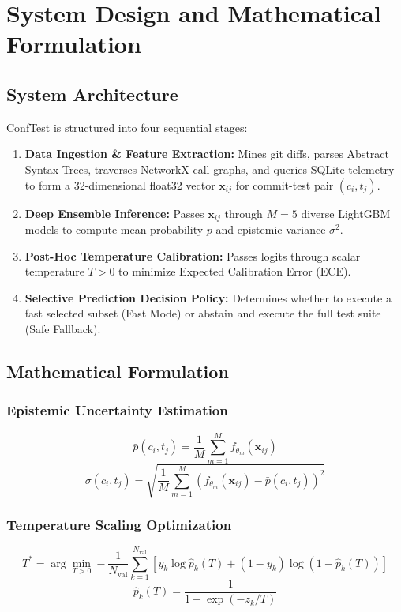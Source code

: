 \chapter{System Design and Mathematical Formulation}

\section{System Architecture}
ConfTest is structured into four sequential stages:
\begin{enumerate}
    \item \textbf{Data Ingestion \& Feature Extraction:} Mines git diffs, parses Abstract Syntax Trees, traverses NetworkX call-graphs, and queries SQLite telemetry to form a 32-dimensional float32 vector $\mathbf{x}_{ij}$ for commit-test pair $(c_i, t_j)$.
    \item \textbf{Deep Ensemble Inference:} Passes $\mathbf{x}_{ij}$ through $M=5$ diverse LightGBM models to compute mean probability $\bar{p}$ and epistemic variance $\sigma^2$.
    \item \textbf{Post-Hoc Temperature Calibration:} Passes logits through scalar temperature $T > 0$ to minimize Expected Calibration Error (ECE).
    \item \textbf{Selective Prediction Decision Policy:} Determines whether to execute a fast selected subset (Fast Mode) or abstain and execute the full test suite (Safe Fallback).
\end{enumerate}

\section{Mathematical Formulation}
\subsection{Epistemic Uncertainty Estimation}
\begin{equation}
    \bar{p}(c_i, t_j) = \frac{1}{M}\sum_{m=1}^M f_{\theta_m}(\mathbf{x}_{ij})
\end{equation}
\begin{equation}
    \sigma(c_i, t_j) = \sqrt{\frac{1}{M}\sum_{m=1}^M \left(f_{\theta_m}(\mathbf{x}_{ij}) - \bar{p}(c_i, t_j)\right)^2}
\end{equation}

\subsection{Temperature Scaling Optimization}
\begin{equation}
    T^* = \arg\min_{T > 0} -\frac{1}{N_{\text{val}}}\sum_{k=1}^{N_{\text{val}}} \left[ y_k \log \hat{p}_k(T) + (1-y_k)\log(1 - \hat{p}_k(T)) \right]
\end{equation}
\begin{equation}
    \hat{p}_k(T) = \frac{1}{1 + \exp(-z_k / T)}
\end{equation}

